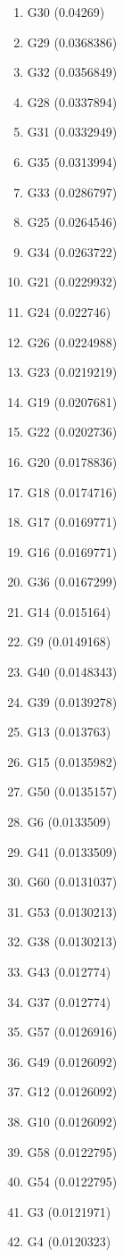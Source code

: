 \begin{enumerate}
\item G30 (0.04269)
\item G29 (0.0368386)
\item G32 (0.0356849)
\item G28 (0.0337894)
\item G31 (0.0332949)
\item G35 (0.0313994)
\item G33 (0.0286797)
\item G25 (0.0264546)
\item G34 (0.0263722)
\item G21 (0.0229932)
\item G24 (0.022746)
\item G26 (0.0224988)
\item G23 (0.0219219)
\item G19 (0.0207681)
\item G22 (0.0202736)
\item G20 (0.0178836)
\item G18 (0.0174716)
\item G17 (0.0169771)
\item G16 (0.0169771)
\item G36 (0.0167299)
\item G14 (0.015164)
\item G9 (0.0149168)
\item G40 (0.0148343)
\item G39 (0.0139278)
\item G13 (0.013763)
\item G15 (0.0135982)
\item G50 (0.0135157)
\item G6 (0.0133509)
\item G41 (0.0133509)
\item G60 (0.0131037)
\item G53 (0.0130213)
\item G38 (0.0130213)
\item G43 (0.012774)
\item G37 (0.012774)
\item G57 (0.0126916)
\item G49 (0.0126092)
\item G12 (0.0126092)
\item G10 (0.0126092)
\item G58 (0.0122795)
\item G54 (0.0122795)
\item G3 (0.0121971)
\item G4 (0.0120323)

\end{enumerate}
